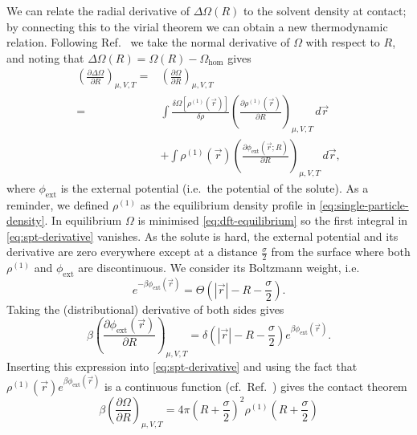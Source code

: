 \documentclass[11pt,twoside]{report}
\begin{document}
We can relate the radial derivative of $\Delta\Omega(R)$ to the solvent density at contact; by connecting this to the virial theorem we can obtain a new thermodynamic relation.
Following Ref.\ \cite{BrykPRE2003} we take the normal derivative of $\Omega$ with respect to $R$, and noting that $\Delta\Omega(R) = \Omega(R) - \Omega_\mathrm{hom}$ gives
\begin{equation}\label{eq:spt-derivative}
  \begin{split}
    \left( \frac{\partial \Delta \Omega}{\partial R} \right)_{\mu,V,T}
    =&
    \left( \frac{\partial \Omega}{\partial R} \right)_{\mu,V,T}
    \\ =&
    \int
    \frac{\delta \Omega[\rho^{(1)}(\vec{r})]}{\delta \rho}
    \left( \frac{\partial \rho^{(1)}(\vec{r})}{\partial R} \right)_{\mu,V,T}
    \, d\vec{r}
    \\ &
    + \int
    \rho^{(1)}(\vec{r})
    \left( \frac{\partial \phi_\mathrm{ext}(\vec{r}; R)}{\partial R} \right)_{\mu,V,T}
    \, d\vec{r},
  \end{split}
\end{equation}
where $\phi_\mathrm{ext}$ is the external potential (i.e.\ the potential of the solute).
As a reminder, we defined $\rho^{(1)}$ as the equilibrium density profile in \eqref{eq:single-particle-density}.
In equilibrium $\Omega$ is minimised \eqref{eq:dft-equilibrium} so the first integral in \eqref{eq:spt-derivative} vanishes.
As the solute is hard, the external potential and its derivative are zero everywhere except at a distance $\frac{\sigma}{2}$ from the surface where both $\rho^{(1)}$ and $\phi_\mathrm{ext}$ are discontinuous.
We consider its Boltzmann weight, i.e.\
\begin{equation*}
  e^{-\beta\phi_\mathrm{ext}(\vec{r})}
  =
  \Theta\left( |\vec{r}| - R - \frac{\sigma}{2} \right).
\end{equation*}
Taking the (distributional) derivative of both sides gives
\begin{equation*}
  \beta\left( \frac{\partial\phi_\mathrm{ext}(\vec{r})}{\partial R} \right)_{\mu,V,T}
  =
  \delta\left( |\vec{r}| - R - \frac{\sigma}{2} \right)
  e^{\beta\phi_\mathrm{ext}(\vec{r})}.
\end{equation*}
Inserting this expression into \eqref{eq:spt-derivative} and using the fact that $\rho^{(1)}(\vec{r}) e^{\beta\phi_\mathrm{ext}(\vec{r})}$ is a continuous function (cf.\ Ref.\ \cite{Hansen2013}) gives the contact theorem
\begin{equation*}
  \beta \left( \frac{\partial \Omega}{\partial R} \right)_{\mu,V,T}
  =
  4\pi \left( R + \frac{\sigma}{2} \right)^2
  \rho^{(1)}\left( R + \frac{\sigma}{2} \right)
\end{equation*}
\end{document}
